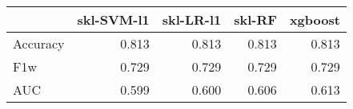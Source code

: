 \begin{tabular}{lrrrr}
\toprule
{} &  skl-SVM-l1 &  skl-LR-l1 &  skl-RF &  xgboost \\
\midrule
Accuracy &       0.813 &      0.813 &   0.813 &    0.813 \\
F1w      &       0.729 &      0.729 &   0.729 &    0.729 \\
AUC      &       0.599 &      0.600 &   0.606 &    0.613 \\
\bottomrule
\end{tabular}

